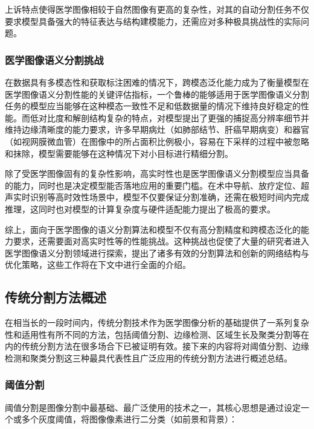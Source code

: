 
上诉特点使得医学图像相较于自然图像有更高的复杂性，对其的自动分割任务不仅要求模型具备强大的特征表达与结构建模能力，还需应对多种极具挑战性的实际问题。

\subsubsection{医学图像语义分割挑战}

在数据具有多模态性和获取标注困难的情况下，跨模态泛化能力成为了衡量模型在医学图像语义分割性能的关键评估指标，一个鲁棒的能够适用于医学图像语义分割任务的模型应当能够在这种模态一致性不足和低数据量的情况下维持良好稳定的性能。而低对比度和解剖结构复杂的特点，对模型提出了更强的捕捉高分辨率细节并维持边缘清晰度的能力要求，许多早期病灶（如肺部结节、肝癌早期病变）和器官（如视网膜微血管）在图像中的所占面积比例极小，容易在下采样的过程中被忽略和抹除，模型需要能够在这种情况下对小目标进行精细分割。

除了受医学图像固有的复杂性影响，高实时性也是医学图像语义分割模型应当具备的能力，同时也是决定模型能否落地应用的重要门槛。在术中导航、放疗定位、超声实时识别等高时效性场景中，模型不仅要保证分割准确，还需在极短时间内完成推理，这同时也对模型的计算复杂度与硬件适配能力提出了极高的要求。

综上，面向于医学图像的语义分割算法和模型不仅有高分割精度和跨模态泛化的能力要求，还需要面对高实时性等的性能挑战。这种挑战也促使了大量的研究者进入医学图像语义分割领域进行探索，提出了诸多有效的分割算法和创新的网络结构与优化策略，这些工作将在下文中进行全面的介绍。

\subsection{传统分割方法概述}

在相当长的一段时间内，传统分割技术作为医学图像分析的基础提供了一系列复杂性和适用性有所不同的方法，包括阈值分割、边缘检测、区域生长及聚类分割等在内的传统分割方法在很多场合下已被证明有效\cite{xu2024}。接下来的内容将对阈值分割、边缘检测和聚类分割这三种最具代表性且广泛应用的传统分割方法进行概述总结。

\subsubsection{阈值分割}

阈值分割是图像分割中最基础、最广泛使用的技术之一，其核心思想是通过设定一个或多个灰度阈值，将图像像素进行二分类（如前景和背景）：

